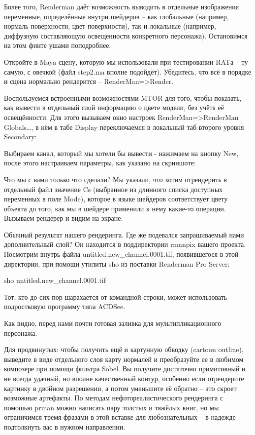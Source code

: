  Более того, Renderman даёт возможность выводить в
    отдельные изображения переменные, определённые внутри шейдеров –
    как глобальные (например, нормаль поверхности, цвет поверхности),
    так и локальные (например, диффузную составляющую освещённости
    конкретного персонажа). Остановимся на этом финте ушами
    поподробнее.
  

 Откройте в Maya сцену, которую мы использовали при
    тестировании RATа – ту самую, с овечкой (файл step2.ma вполне
    подойдёт). Убедитесь, что всё в порядке и сцена нормально
    рендерится – RenderMan=>Render.
  

 Воспользуемся встроенными возможностями MTOR для
    того, чтобы показать, как вывести в отдельный слой информацию о
    цвете модели, без учёта её освещённости. Для этого вызываем окно
    настроек RenderMan=>RenderMan Globals…, в нём в табе Display
    переключаемся в локальный таб второго уровня Secondary:
  

  

 Выбираем канал, который мы хотели бы вывести
    -  нажимаем на кнопку
    New, после этого настраиваем параметры, как указано на
    скриншоте:
  

  

 Что мы с вами только что сделали? Мы указали, что
    хотим отрендерить в отдельный файл значение Cs (выбранное из
    длинного списка доступных переменных в поле Mode), которое в языке
    шейдеров соответствует цвету объекта до того, как мы в шейдере
    применили к нему какие-то операции. Вызываем рендерер и видим на
    экране:
  

  

 Обычный результат нашего рендеринга. Где же
    подевался запрашиваемый нами дополнительный слой? Он находится в
    поддиректории rmanpix вашего проекта. Посмотрим внутрь файла
    untitled.new\_channel.0001.tif, появившегося в этой директории, при
    помощи утилиты sho из поставки Renderman Pro Server:
  

sho untitled.new\_channel.0001.tif
  

    Тот, кто до сих пор шарахается от командной строки, может
    использовать подростковую программу типа ACDSee.
  

  

 Как видно, перед нами почти готовая заливка для
    мультипликационного персонажа.
  

 Для
    продвинутых: чтобы получить ещё и
    картунную обводку (cartoon outline), выведите в виде отдельного
    слоя карту нормалей и преобразуйте ее в любимом композере при
    помощи фильтра Sobel. Вы получите достаточно примитивный и не
    всегда удачный, но вполне качественный контур, особенно если
    отрендерите картинку в двойном разрешении, а потом уменьшите её
    обратно – это скроет возможные артефакты. По методам
    нефотореалистического рендеринга с помошью prman можно написать
    пару толстых и тяжёлых книг, но мы ограничимся тремя фразами в этой
    вставке для любознательных – в надежде подтолкнуть вас в нужном
    направлении.
  

